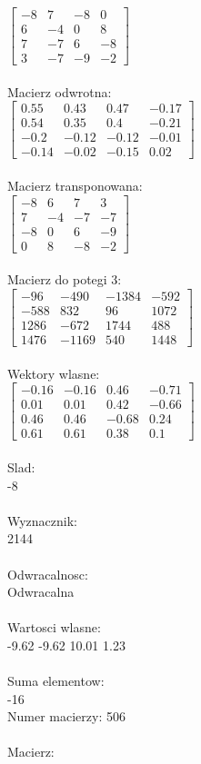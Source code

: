 \documentclass[a4paper,12pt]{article}
\begin{document}
$\begin{bmatrix} -8&7&-8&0\\6&-4&0&8\\7&-7&6&-8\\3&-7&-9&-2 \end{bmatrix}$
\\
\\
Macierz odwrotna:\\

$\begin{bmatrix} 0.55&0.43&0.47&-0.17\\0.54&0.35&0.4&-0.21\\-0.2&-0.12&-0.12&-0.01\\-0.14&-0.02&-0.15&0.02 \end{bmatrix}$
\\
\\
Macierz transponowana:\\

$\begin{bmatrix} -8&6&7&3\\7&-4&-7&-7\\-8&0&6&-9\\0&8&-8&-2 \end{bmatrix}$
\\
\\
Macierz do potegi 3:\\

$\begin{bmatrix} -96&-490&-1384&-592\\-588&832&96&1072\\1286&-672&1744&488\\1476&-1169&540&1448 \end{bmatrix}$
\\
\\
Wektory wlasne:\\

$\begin{bmatrix} -0.16&-0.16&0.46&-0.71\\0.01&0.01&0.42&-0.66\\0.46&0.46&-0.68&0.24\\0.61&0.61&0.38&0.1 \end{bmatrix}$
\\
\\
Slad:\\
-8
\\
\\
Wyznacznik:\\
2144
\\
\\
Odwracalnosc:\\
Odwracalna
\\
\\
Wartosci wlasne:\\
-9.62 -9.62 10.01 1.23
\\
\\
Suma elementow:\\
-16
\\
\newpage
Numer macierzy:
506
\\
\\
Macierz:\\
\end{document}
